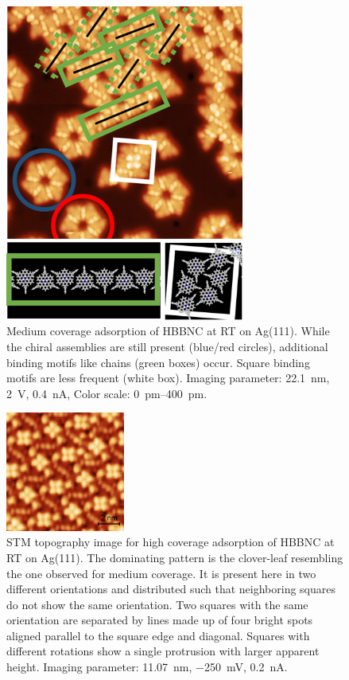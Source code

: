 \begin{figure}[] \centering
	\includegraphics[width=0.7\textwidth]{./images/hbbnc-ag-111-rt-med-coverage-3}
	\caption{Medium coverage adsorption of HBBNC at RT on Ag(111). While the chiral assemblies are still present (blue/red circles), additional binding motifs like chains (green boxes) occur. Square  binding motifs are less frequent (white box). Imaging parameter: \SI{22.1}{\nano \meter}, \SI{2}{\volt}, \SI{0.4}{\nano \ampere}, Color scale: \SIrange{0}{400}{\pico \meter}.}
	\label{fig:HBBNC-medium-coverage-different-motifs}
\end{figure}

\begin{figure}[] \centering
	\includegraphics[width=0.35\textwidth]{./images/A180515-095412}
	\caption{STM topography image for high coverage adsorption of HBBNC at RT on Ag(111). The dominating pattern is the clover-leaf resembling the one observed for medium coverage. It is present here in two different orientations and distributed such that neighboring squares do not show the same orientation. Two squares with the same orientation are separated by lines made up of four bright spots aligned parallel to the square edge and diagonal. Squares with different rotations show a single protrusion with larger apparent height. Imaging parameter: \SI{11.07}{\nano \meter}, \SI{-250}{\milli \volt}, \SI{0.2}{\nano \ampere}.}
	\label{fig:HBBNC-high-coverage}
\end{figure}

